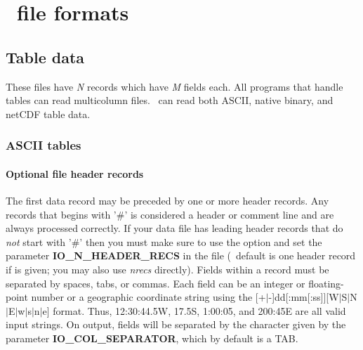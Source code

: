 %
%

\chapter{\gmt\ file formats}
\label{app:B}
\thispagestyle{headings}

\section{Table data}

These files have \emph{N} records which have \emph{M} fields each.
All programs that handle tables can read multicolumn files.  \GMT\ can
read both ASCII, native binary, and netCDF table data.

\subsection{ASCII tables}

\subsubsection{Optional file header records}
The first data record may be preceded by one or more header records.
Any records that begins with '\#' is considered a header or comment
line and are always processed correctly.  If your data file has leading
header records that do \emph{not} start with '\#' then you must
make sure to use the  option and set
the parameter \textbf{IO\_N\_HEADER\_RECS} in the  file
(\GMT\ default is one header record if  is given; you may also
use \emph{nrecs} directly).  Fields
within a record must be separated by spaces, tabs, or commas.
Each field can be an integer or floating-point number or a geographic
coordinate string using the [+$|$-]dd[:mm[:ss]][W$|$S$|$N$|$E$|$w$|$s$|$n$|$e] format.
Thus, 12:30:44.5W, 17.5S, 1:00:05, and 200:45E are all valid input strings.
On output, fields will be separated by the character given by the parameter \textbf{IO\_COL\_SEPARATOR},
which by default is a TAB.

